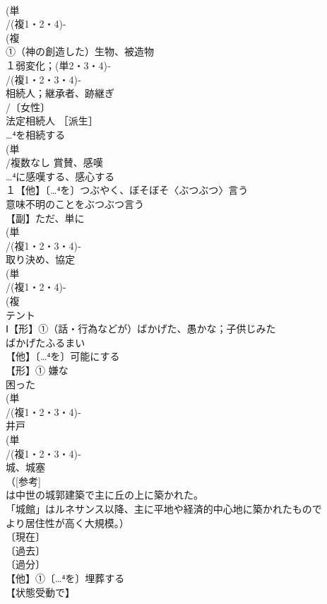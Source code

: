 \documentclass[8pt]{extreport}
\begin{document}
\begin{CJK}{UTF8}{min}
\\	(単
\\	/(複1・2・4)-
\\	(複
\\	①（神の創造した）生物、被造物 
\\	１弱変化；(単2・3・4)‐
\\	/(複1・2・3・4)‐
\\	相続人；継承者、跡継ぎ 
\\	/〔女性〕
\\	法定相続人 ［派生］ 
\\	…⁴を相続する
\\	(単
\\	/複数なし 賞賛、感嘆 
\\	…⁴に感嘆する、感心する
\\	１【他】〔…⁴を〕つぶやく、ぼそぼそ〈ぶつぶつ〉言う 
\\	意味不明のことをぶつぶつ言う
\\	【副】ただ、単に
\\	(単
\\	/(複1・2・3・4)‐
\\	取り決め、協定 
\\	(単
\\	/(複1・2・4)-
\\	(複
\\	テント 
\\	Ⅰ【形】①（話・行為などが）ばかげた、愚かな；子供じみた 
\\	ばかげたふるまい
\\	【他】〔…⁴を〕可能にする
\\	【形】① 嫌な　
\\	困った
\\	(単
\\	/(複1・2・3・4)‐ 
\\	井戸 
\\	(単
\\	/(複1・2・3・4)‐
\\	城、城塞 
\\	（[参考] 
\\	は中世の城郭建築で主に丘の上に築かれた。
\\	「城館」はルネサンス以降、主に平地や経済的中心地に築かれたもので
\\	より居住性が高く大規模。）
\\	〔現在〕
\\	〔過去〕
\\	〔過分〕
\\	【他】①〔…⁴を〕埋葬する 
\\	【状態受動で】

\end{CJK}
\end{document}
